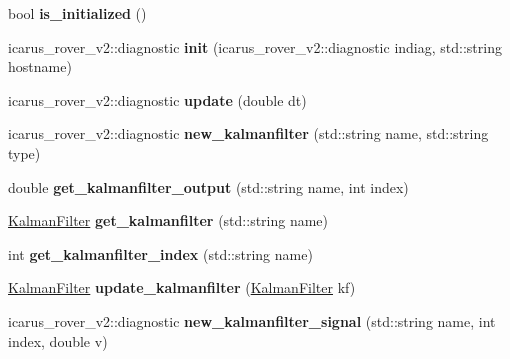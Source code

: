 \begin{DoxyCompactItemize}
\item 
\mbox{\label{classPoseNodeProcess_a686ca898ecfd13b77dc6a1ed0dc1281d}} 
bool {\bfseries is\+\_\+initialized} ()
\item 
\mbox{\label{classPoseNodeProcess_a43bad88471a93cbb08f42d6f07d5bd34}} 
icarus\+\_\+rover\+\_\+v2\+::diagnostic {\bfseries init} (icarus\+\_\+rover\+\_\+v2\+::diagnostic indiag, std\+::string hostname)
\item 
\mbox{\label{classPoseNodeProcess_aec01f159a01de73bf9a02cc03652cf66}} 
icarus\+\_\+rover\+\_\+v2\+::diagnostic {\bfseries update} (double dt)
\item 
\mbox{\label{classPoseNodeProcess_ab2870e405900023b1aabdd479637a942}} 
icarus\+\_\+rover\+\_\+v2\+::diagnostic {\bfseries new\+\_\+kalmanfilter} (std\+::string name, std\+::string type)
\item 
\mbox{\label{classPoseNodeProcess_a830c4e3b8c8284fea57cb673de419c0b}} 
double {\bfseries get\+\_\+kalmanfilter\+\_\+output} (std\+::string name, int index)
\item 
\mbox{\label{classPoseNodeProcess_a5c444a4046238f8cfab710b84f2f9f59}} 
\hyperlink{structKalmanFilter}{Kalman\+Filter} {\bfseries get\+\_\+kalmanfilter} (std\+::string name)
\item 
\mbox{\label{classPoseNodeProcess_a798e0df2c502a707b7f66244a75c2fb7}} 
int {\bfseries get\+\_\+kalmanfilter\+\_\+index} (std\+::string name)
\item 
\mbox{\label{classPoseNodeProcess_a4588f77b8c031afc697d9166539f8a44}} 
\hyperlink{structKalmanFilter}{Kalman\+Filter} {\bfseries update\+\_\+kalmanfilter} (\hyperlink{structKalmanFilter}{Kalman\+Filter} kf)
\item 
\mbox{\label{classPoseNodeProcess_a090b0745e183a0b7e064fb5ac72f4923}} 
icarus\+\_\+rover\+\_\+v2\+::diagnostic {\bfseries new\+\_\+kalmanfilter\+\_\+signal} (std\+::string name, int index, double v)

\end{DoxyCompactItemize}
